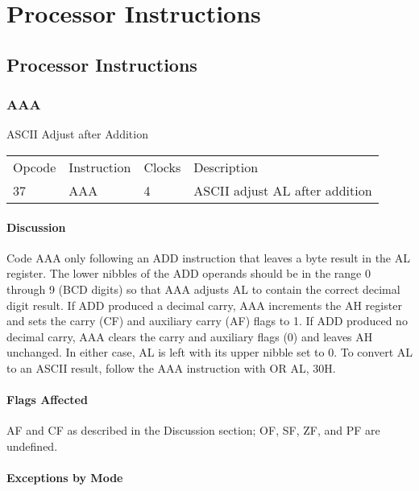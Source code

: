  

\chapter[Processor Instructions]{Processor Instructions}

\section{Processor Instructions}

\subsection*{AAA}
ASCII Adjust after Addition

\begin{tabular}{l l l l}
Opcode & Instruction & Clocks & Description\\
37 & AAA & 4 & ASCII adjust AL after addition\\
\end{tabular}

\subsubsection{Discussion}
Code AAA only following an ADD instruction that leaves a byte result in the AL register. The lower nibbles of the ADD operands should be in the range 0 through 9 (BCD digits) so that AAA adjusts AL to contain the correct decimal digit result. If ADD produced a decimal carry, AAA increments the AH register and sets the carry (CF) and auxiliary carry (AF) flags to 1. If ADD produced no decimal carry, AAA clears the carry and auxiliary flags (0) and leaves AH unchanged. In either case, AL is left with its upper nibble set to 0. To convert AL to an ASCII result, follow the AAA instruction with OR AL, 30H.

\subsubsection{Flags Affected}
AF and CF as described in the Discussion section; OF, SF, ZF, and PF are undefined.

\subsubsection{Exceptions by Mode}

